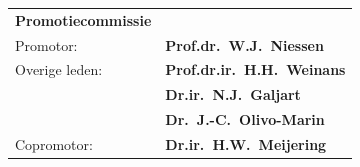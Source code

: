 \newpage
\thispagestyle{empty}
\label{othersideformal}

\begin{tabular}{@{}ll@{}}
\large\bf{Promotiecommissie} &\\ [8ex]
Promotor:    & {\bf Prof.dr.~W.J.~Niessen}\\[3ex]
Overige leden: & {\bf Prof.dr.ir.~H.H.~Weinans}\\[1ex]
&{\bf Dr.ir.~N.J.~Galjart}\\[1ex]
&{\bf Dr.~J.-C.~Olivo-Marin}\\[3ex]
Copromotor: & {\bf Dr.ir.~H.W.~Meijering}\\
\end{tabular}






\setlength{\parindent}{\myindent}


